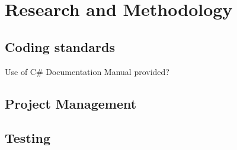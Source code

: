 \chapter{Research and Methodology}

\section{Coding standards}
Use of C\#
Documentation
Manual provided? 
\section{Project Management}

\section{Testing}